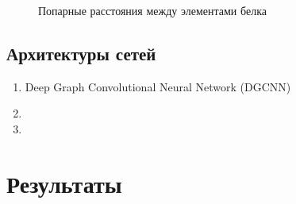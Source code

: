 \documentclass[12pt,twosides]{article}
\begin{document}
\begin{figure}[!h]
\begin{minipage}[b]{0.45\textwidth}
					\caption{Попарные расстояния между элементами белка}
				\end{minipage}
			\end{figure}

			
			\subsection{Архитектуры сетей}
				\begin{enumerate}
					\item Deep Graph Convolutional Neural Network (DGCNN)\cite{Zhang2018AnED}
					\item 
					\item 
				\end{enumerate}
	
	\section{Результаты}
	
	
	

	
	\nocite{*}
	
	
\end{document}
